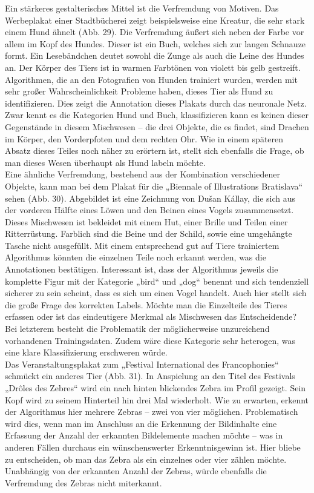 \documentclass[a4paper,12pt,ngerman]{article}
\begin{document}
Ein stärkeres gestalterisches Mittel ist die Verfremdung von Motiven. Das Werbeplakat einer Stadtbücherei zeigt beispielsweise eine Kreatur, die sehr stark einem Hund ähnelt (Abb. 29). Die Verfremdung äußert sich neben der Farbe vor allem im Kopf des Hundes. Dieser ist ein Buch, welches sich zur langen Schnauze formt. Ein Lesebändchen deutet sowohl die Zunge als auch die Leine des Hundes an. Der Körper des Tiers ist in warmen Farbtönen von violett bis gelb gestreift. Algorithmen, die an den Fotografien von Hunden trainiert wurden, werden mit sehr großer Wahrscheinlichkeit Probleme haben, dieses Tier als Hund zu identifizieren. Dies zeigt die Annotation dieses Plakats durch das neuronale Netz. Zwar kennt es die Kategorien Hund und Buch, klassifizieren kann es keinen dieser Gegenstände in diesem Mischwesen -- die drei Objekte, die es findet, sind Drachen im Körper, den Vorderpfoten und dem rechten Ohr. Wie in einem späteren Absatz dieses Teiles noch näher zu erörtern ist, stellt sich ebenfalls die Frage, ob man dieses Wesen überhaupt als Hund labeln möchte. \\
Eine ähnliche Verfremdung, bestehend aus der Kombination verschiedener Objekte, kann man bei dem Plakat für die „Biennale of Illustrations Bratislava“ sehen (Abb. 30). Abgebildet ist eine Zeichnung von Dušan Kállay, die sich aus der vorderen Hälfte eines Löwen und den Beinen eines Vogels zusammensetzt. Dieses Mischwesen ist bekleidet mit einem Hut, einer Brille und Teilen einer Ritterrüstung. Farblich sind die Beine und der Schild, sowie eine umgehängte Tasche nicht ausgefüllt. Mit einem entsprechend gut auf Tiere trainiertem Algorithmus könnten die einzelnen Teile noch erkannt werden, was die Annotationen bestätigen. Interessant ist, dass der Algorithmus jeweils die komplette Figur mit der Kategorie „bird“ und „dog“ benennt und sich tendenziell sicherer zu sein scheint, dass es sich um einen Vogel handelt. Auch hier stellt sich die große Frage des korrekten Labels. Möchte man die Einzelteile des Tieres erfassen oder ist das eindeutigere Merkmal als Mischwesen das Entscheidende? Bei letzterem besteht die Problematik der möglicherweise unzureichend vorhandenen Trainingsdaten. Zudem wäre diese Kategorie sehr heterogen, was eine klare Klassifizierung erschweren würde. \\
Das Veranstaltungsplakat zum „Festival International des Francophonies“ schmückt ein anderes Tier (Abb. 31). In Anspielung an den Titel des Festivals „Drôles des Zebres“ wird ein nach hinten blickendes Zebra im Profil gezeigt. Sein Kopf wird zu seinem Hinterteil hin drei Mal wiederholt. Wie zu erwarten, erkennt der Algorithmus hier mehrere Zebras -- zwei von vier möglichen. Problematisch wird dies, wenn man im Anschluss an die Erkennung der Bildinhalte eine Erfassung der Anzahl der erkannten Bildelemente machen möchte -- was in anderen Fällen durchaus ein wünschenswerter Erkenntnisgewinn ist. Hier bliebe zu entscheiden, ob man das Zebra als ein einzelnes oder vier zählen möchte. Unabhängig von der erkannten Anzahl der Zebras, würde ebenfalls die Verfremdung des Zebras nicht miterkannt. \\
\end{document}
